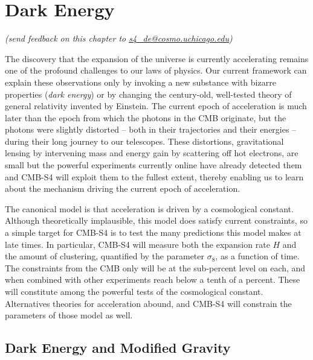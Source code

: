 
\chapter{Dark Energy}

\begin{center}
{\small \it (send feedback on this chapter to \href{mailto:s4_de@cosmo.uchicago.edu}{s4\_de@cosmo.uchicago.edu})}
\end{center}

The discovery that the expansion of the universe is currently accelerating remains one of the profound challenges to our laws of physics. Our current framework can explain these observations only by invoking a new substance with bizarre properties ({\it dark energy}) or by changing the century-old, well-tested theory of general relativity invented by Einstein. The current epoch of acceleration is much later than the epoch from which the photons in the CMB originate, but the photons were slightly distorted -- both in their trajectories and their energies -- during their long journey to our telescopes. These distortions, gravitational lensing by intervening mass and energy gain by scattering off hot electrons, are small but the powerful experiments currently online have already detected them and CMB-S4 will exploit them to the fullest extent, thereby enabling us to learn about the mechanism driving the current epoch of acceleration.

The canonical model is that acceleration is driven by a cosmological constant. Although theoretically implausible, this model does satisfy current constraints, so a simple target for CMB-S4 is to test the many predictions this model makes at late times. In particular, CMB-S4 will measure both the expansion rate $H$ and the amount of clustering, quantified by the parameter $\sigma_8$, as a function of time. The constraints from the CMB only will be at the sub-percent level on each, and when combined with other experiments reach below a tenth of a percent. These will constitute among the powerful tests of the cosmological constant. Alternatives theories for acceleration abound, and CMB-S4 will constrain the parameters of those model as well. 

\section{Dark Energy and Modified Gravity}


